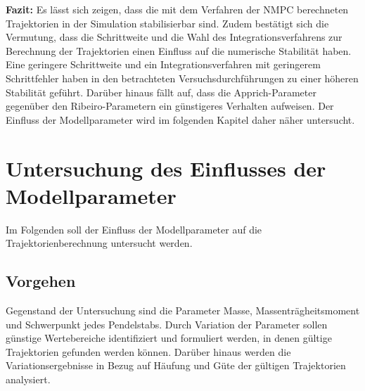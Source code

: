 \textbf{Fazit:}
Es lässt sich zeigen, dass die mit dem Verfahren der NMPC berechneten Trajektorien in der Simulation stabilisierbar sind. Zudem bestätigt sich die Vermutung, dass die Schrittweite und die Wahl des Integrationsverfahrens zur Berechnung der Trajektorien einen Einfluss auf die numerische Stabilität haben. Eine geringere Schrittweite und ein Integrationsverfahren mit geringerem Schrittfehler haben in den betrachteten Versuchsdurchführungen zu einer höheren Stabilität geführt. Darüber hinaus fällt auf, dass die Apprich-Parameter gegenüber den Ribeiro-Parametern ein günstigeres Verhalten aufweisen. Der Einfluss der Modellparameter wird im folgenden Kapitel daher näher untersucht. 






\section{Untersuchung des Einflusses der Modellparameter}\label{sec:trjparamtest}

Im Folgenden soll der Einfluss der Modellparameter auf die Trajektorienberechnung untersucht werden.

\subsection{Vorgehen}

Gegenstand der Untersuchung sind die Parameter Masse, Massenträgheitsmoment und Schwerpunkt jedes Pendelstabs. Durch Variation der Parameter sollen günstige Wertebereiche identifiziert und formuliert werden, in denen gültige Trajektorien gefunden werden können. Darüber hinaus werden die Variationsergebnisse in Bezug auf Häufung und Güte der gültigen Trajektorien analysiert.

